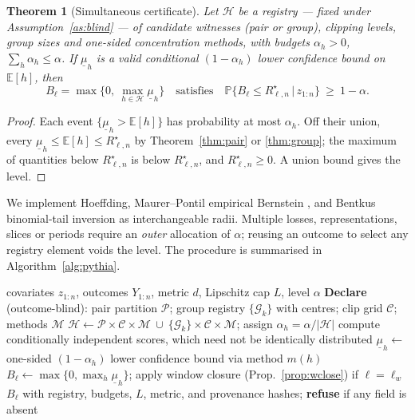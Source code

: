 \documentclass[11pt]{article}
\newtheorem{theorem}{Theorem}
\theoremstyle{definition}
\newcommand{\risk}{R^{\star}}
\newcommand{\E}{\mathbb{E}}
\newcommand{\Prob}{\mathbb{P}}
\begin{document}
\begin{theorem}[Simultaneous certificate]\label{thm:cert}
Let $\mathcal H$ be a registry --- fixed under Assumption~\ref{as:blind} --- of candidate witnesses (pair or group), clipping levels, group sizes and one-sided concentration methods, with budgets $\alpha_h>0$, $\sum_{h}\alpha_h\le\alpha$. If $\underline\mu_h$ is a valid conditional $(1-\alpha_h)$ lower confidence bound on $\E[h]$, then
\[
B_\ell=\max\Big\{0,\ \max_{h\in\mathcal H}\underline\mu_h\Big\}
\quad\text{satisfies}\quad
\Prob\big\{B_\ell\le \risk_{\ell,n}\,\big|\,z_{1:n}\big\}\ \ge\ 1-\alpha .
\]
\end{theorem}
\begin{proof}
Each event $\{\underline\mu_h>\E[h]\}$ has probability at most $\alpha_h$. Off their union, every $\underline\mu_h\le\E[h]\le\risk_{\ell,n}$ by Theorem~\ref{thm:pair} or \ref{thm:group}; the maximum of quantities below $\risk_{\ell,n}$ is below $\risk_{\ell,n}$, and $\risk_{\ell,n}\ge0$. A union bound gives the level.
\end{proof}
We implement Hoeffding, Maurer--Pontil empirical Bernstein \citep{maurer}, and Bentkus binomial-tail inversion \citep{bentkus} as interchangeable radii. Multiple losses, representations, slices or periods require an \emph{outer} allocation of $\alpha$; reusing an outcome to select any registry element voids the level. The procedure is summarised in Algorithm~\ref{alg:pythia}.

\begin{algorithm}[t]
\caption{Pythia certificate for loss $\ell$}\label{alg:pythia}
\begin{algorithmic}[1]
\Require covariates $z_{1:n}$, outcomes $Y_{1:n}$, metric $d$, Lipschitz cap $L$, level $\alpha$
\State \textbf{Declare} (outcome-blind): pair partition $\mathcal P$; group registry $\{\mathcal G_k\}$ with centres; clip grid $\mathcal C$; methods $\mathcal M$
\State $\mathcal H\gets \mathcal P\times\mathcal C\times\mathcal M\ \cup\ \{\mathcal G_k\}\times\mathcal C\times\mathcal M$; assign $\alpha_h=\alpha/|\mathcal H|$
  \State compute conditionally independent scores, which need not be identically distributed
  \State $\underline\mu_h\gets$ one-sided $(1-\alpha_h)$ lower confidence bound via method $m(h)$
\EndFor
\State $B_\ell\gets\max\{0,\max_h\underline\mu_h\}$; apply window closure (Prop.~\ref{prop:wclose}) if $\ell=\ell_w$
\State \Return $B_\ell$ with registry, budgets, $L$, metric, and provenance hashes; \textbf{refuse} if any field is absent
\end{algorithmic}
\end{algorithm}
\end{document}
